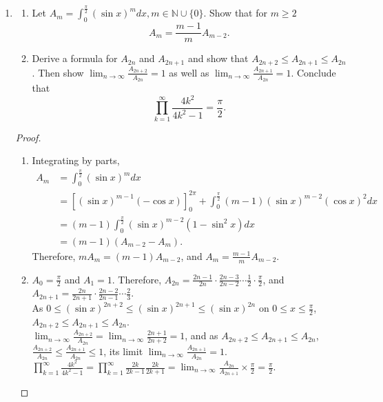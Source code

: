 \documentclass{article}
\begin{document}
\begin{enumerate}[font = \Large\bfseries\itshape\space, leftmargin = 3mm, labelsep = 3mm]
\item
\begin{enumerate}[label=(\roman*)]
\item
Let $A_m = \int_0^{\frac{\pi}{2}}(\sin x)^mdx, m \in \mathbb{N} \cup \{0\}$.
Show that for $m \geq 2$
$$A_m = \frac{m-1}{m} A_{m-2}.$$
\item
Derive a formula for $A_{2n}$ and $A_{2n+1}$ and show that $A_{2n+2} \leq A_{2n+1} \leq A_{2n}$.
Then show $\lim_{n\rightarrow\infty} \frac{A_{2n+2}}{A_{2n}} = 1$ as well as $\lim_{n\rightarrow\infty} \frac{A_{2n+1}}{A_{2n}} = 1$.
Conclude that
$$\prod_{k=1}^\infty \frac{4k^2}{4k^2-1} = \frac{\pi}{2}.$$
\end{enumerate}
\begin{proof}
\begin{enumerate}[label=(\roman*)]
\item
Integrating by parts,
$$
\begin{aligned}
A_m &= \int_0^{\frac{\pi}{2}}(\sin x)^m dx\\
&= \left[(\sin x)^{m-1} (-\cos x)\right]_0^{2\pi} + \int_0^{\frac{\pi}{2}} (m-1)(\sin x)^{m-2} (\cos x)^2dx\\
&= (m-1)\int_0^{\frac{\pi}{2}} (\sin x)^{m-2}(1-\sin^2 x) dx\\
&= (m-1) (A_{m-2} - A_m).
\end{aligned}
$$
Therefore, $mA_m = (m-1) A_{m-2}$, and $A_m = \frac{m-1}{m}A_{m-2}$.

\item
$A_0 =\frac{\pi}{2}$ and $A_1 = 1$.
Therefore, $A_{2n} = \frac{2n-1}{2n} \cdot \frac{2n-3}{2n-2} \cdots \frac{1}{2} \cdot \frac{\pi}{2}$, and
$A_{2n+1} = \frac{2n}{2n+1} \cdot \frac{2n-2}{2n-1} \cdots \frac{2}{3}$.\\
As $0 \leq (\sin x)^{2n+2} \leq (\sin x)^{2n+1} \leq (\sin x)^{2n}$ on $0 \leq x \leq \frac{\pi}{2}$, $A_{2n+2} \leq A_{2n+1} \leq A_{2n}$.\\
$\lim_{n\rightarrow\infty} \frac{A_{2n+2}}{A_{2n}} = \lim_{n\rightarrow\infty}\frac{2n+1}{2n+2} = 1$, and as $A_{2n+2} \leq A_{2n+1} \leq A_{2n}$, $\frac{A_{2n+2}}{A_{2n}} \leq \frac{A_{2n+1}}{A_{2n}} \leq 1$, its limit $\lim_{n\rightarrow\infty}\frac{A_{2n+1}}{A_{2n}} = 1$.\\
$\prod_{k=1}^\infty \frac{4k^2}{4k^2-1} = \prod_{k=1}^\infty \frac{2k}{2k-1} \frac{2k}{2k+1} = \lim_{n\rightarrow\infty} \frac{A_{2n}}{A_{2n+1}} \times \frac{\pi}{2} = \frac{\pi}{2}$.

\end{enumerate}
\end{proof}

\end{enumerate}
\end{document}
